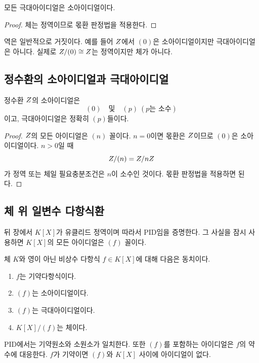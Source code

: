\begin{corollary}
모든 극대아이디얼은 소아이디얼이다.
\end{corollary}

\begin{proof}
체는 정역이므로 몫환 판정법을 적용한다.
\end{proof}

역은 일반적으로 거짓이다. 예를 들어 $Z$에서 $(0)$은 소아이디얼이지만 극대아이디얼은 아니다. 실제로 $Z/(0)\cong Z$는 정역이지만 체가 아니다.

\subsection{정수환의 소아이디얼과 극대아이디얼}

\begin{theorem}
정수환 $Z$의 소아이디얼은
\[
  (0)\quad\text{및}\quad (p)\ (p\text{는 소수})
\]
이고, 극대아이디얼은 정확히 $(p)$들이다.
\end{theorem}

\begin{proof}
$Z$의 모든 아이디얼은 $(n)$ 꼴이다. $n=0$이면 몫환은 $Z$이므로 $(0)$은 소아이디얼이다. $n>0$일 때
\[
  Z/(n)=Z/nZ
\]
가 정역 또는 체일 필요충분조건은 $n$이 소수인 것이다. 몫환 판정법을 적용하면 된다.
\end{proof}

\subsection{체 위 일변수 다항식환}

뒤 장에서 $K[X]$가 유클리드 정역이며 따라서 PID임을 증명한다. 그 사실을 잠시 사용하면 $K[X]$의 모든 아이디얼은 $(f)$ 꼴이다.

\begin{proposition}
체 $K$와 영이 아닌 비상수 다항식 $f\in K[X]$에 대해 다음은 동치이다.
\begin{enumerate}[label=(\roman*)]
  \item $f$는 기약다항식이다.
  \item $(f)$는 소아이디얼이다.
  \item $(f)$는 극대아이디얼이다.
  \item $K[X]/(f)$는 체이다.
\end{enumerate}
\end{proposition}

\begin{proofidea}
PID에서는 기약원소와 소원소가 일치한다. 또한 $(f)$를 포함하는 아이디얼은 $f$의 약수에 대응한다. $f$가 기약이면 $(f)$와 $K[X]$ 사이에 아이디얼이 없다.
\end{proofidea}

